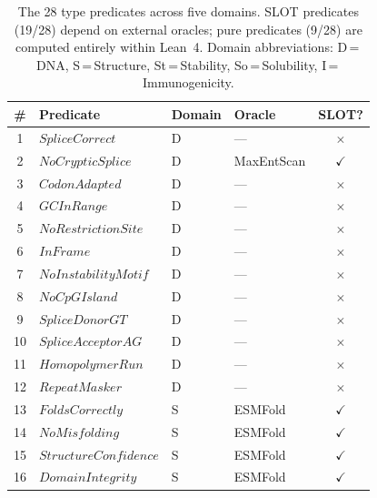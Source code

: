 \documentclass[sigplan,10pt,manuscript,review,anonymous]{acmart}
\begin{document}
\begin{table}[t]
\centering
\caption{The 28 type predicates across five domains. SLOT predicates
         (19/28) depend on external oracles; pure predicates (9/28)
         are computed entirely within Lean~4.
         Domain abbreviations: D\,=\,DNA, S\,=\,Structure,
         St\,=\,Stability, So\,=\,Solubility, I\,=\,Immunogenicity.}
\label{tab:predicates28}
\begin{tabular}{clllc}
\toprule
\textbf{\#} & \textbf{Predicate} & \textbf{Domain} &
  \textbf{Oracle} & \textbf{SLOT?} \\
\midrule
 1 & $\mathit{SpliceCorrect}$          & D  & ---                   & $\times$ \\
 2 & $\mathit{NoCrypticSplice}$        & D  & MaxEntScan            & $\checkmark$ \\
 3 & $\mathit{CodonAdapted}$           & D  & ---                   & $\times$ \\
 4 & $\mathit{GCInRange}$              & D  & ---                   & $\times$ \\
 5 & $\mathit{NoRestrictionSite}$      & D  & ---                   & $\times$ \\
 6 & $\mathit{InFrame}$                & D  & ---                   & $\times$ \\
 7 & $\mathit{NoInstabilityMotif}$     & D  & ---                   & $\times$ \\
 8 & $\mathit{NoCpGIsland}$            & D  & ---                   & $\times$ \\
 9 & $\mathit{SpliceDonorGT}$          & D  & ---                   & $\times$ \\
10 & $\mathit{SpliceAcceptorAG}$       & D  & ---                   & $\times$ \\
11 & $\mathit{HomopolymerRun}$         & D  & ---                   & $\times$ \\
12 & $\mathit{RepeatMasker}$           & D  & ---                   & $\times$ \\
\midrule
13 & $\mathit{FoldsCorrectly}$         & S  & ESMFold               & $\checkmark$ \\
14 & $\mathit{NoMisfolding}$           & S  & ESMFold               & $\checkmark$ \\
15 & $\mathit{StructureConfidence}$    & S  & ESMFold               & $\checkmark$ \\
16 & $\mathit{DomainIntegrity}$        & S  & ESMFold               & $\checkmark$ \\
\midrule

\end{tabular}
\end{table}
\end{document}
